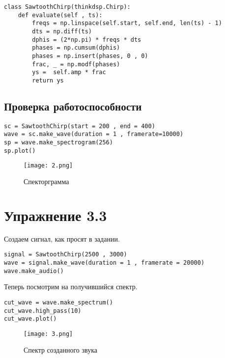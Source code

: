 \documentclass[a4paper,12pt]{report}
\begin{document}
\begin{lstlisting}[caption=Класс SawtoothChirp]
class SawtoothChirp(thinkdsp.Chirp):
    def evaluate(self , ts):
        freqs = np.linspace(self.start, self.end, len(ts) - 1)
        dts = np.diff(ts)
        dphis = (2*np.pi) * freqs * dts
        phases = np.cumsum(dphis)
        phases = np.insert(phases, 0 , 0)
        frac, _ = np.modf(phases)
        ys =  self.amp * frac
        return ys
\end{lstlisting}

\section{Проверка работоспособности}

\begin{lstlisting}[caption=Проверка]
sc = SawtoothChirp(start = 200 , end = 400)
wave = sc.make_wave(duration = 1 , framerate=10000)
sp = wave.make_spectrogram(256)
sp.plot()
\end{lstlisting}
    
\begin{figure}[H]
        \centering
        \texttt{[image: 2.png]}
        \caption{Спекторграмма}
        \label{fig:lab3_fig2}
\end{figure}

\chapter{Упражнение 3.3}


Создаем сигнал, как просят в задании.

\begin{lstlisting}[caption=Создание сигнала]
signal = SawtoothChirp(2500 , 3000)
wave = signal.make_wave(duration = 1 , framerate = 20000)
wave.make_audio()
\end{lstlisting}

Теперь посмотрим на получившийся спектр.

\begin{lstlisting}[caption=Визуализация спектра]
cut_wave = wave.make_spectrum()
cut_wave.high_pass(10)
cut_wave.plot()
\end{lstlisting}

\begin{figure}[H]
        \centering
        \texttt{[image: 3.png]}
        \caption{Спектр созданного звука}
        \label{fig:lab3_fig4}
\end{figure}
\end{document}
